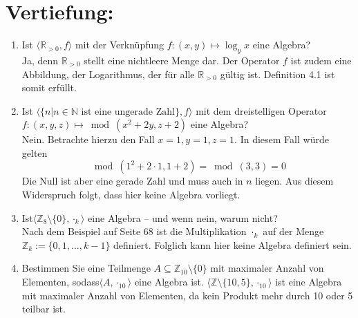 

\DeclareMathOperator{\kgV}{kgV}


    \maketitle
    \section*{Vertiefung:}
    \begin{enumerate}[label=(\alph*)]
        \item Ist $\langle \mathbb{R}_{>0} , f \rangle$ mit der Verknüpfung $f : (x,y) \mapsto  \log_y x$ eine Algebra? \\
        Ja, denn $\mathbb{R}_{>0}$ stellt eine nichtleere Menge dar. Der Operator $f$ ist zudem eine Abbildung, 
        der Logarithmus, der für alle $\mathbb{R}_{>0}$ gültig ist. Definition 4.1 ist somit erfüllt.
        
        \item Ist $\langle \{n| n \in \mathbb{N} \textrm{ ist eine ungerade Zahl} \}, f \rangle$ mit dem dreistelligen 
        Operator $f : (x,y,z) \mapsto \bmod(x^2 + 2y, z + 2)$ eine Algebra? \\
        Nein. Betrachte hierzu den Fall $x = 1, y = 1, z = 1$. In diesem Fall würde gelten 
        $$\bmod(1^2 + 2 \cdot 1, 1 + 2 ) = \bmod(3,3) = 0$$ Die Null ist aber eine gerade Zahl und muss auch 
        in $n$ liegen. Aus diesem Widerspruch folgt, dass hier keine Algebra vorliegt.
        
        \item
         Ist$\langle \mathbb{Z}_8 \setminus \{0\}, \cdot_k \rangle $ eine Algebra – und wenn nein, warum nicht? \\
         Nach dem Beispiel auf Seite 68 ist die Multiplikation $\cdot_k$ auf der Menge $\mathbb{Z}_k := \{0, 1, ..., k-1\}$ definiert. Folglich kann hier keine Algebra definiert sein.
        \item
        Bestimmen Sie eine Teilmenge $A \subseteq \mathbb{Z}_{10} \setminus \{0\} $ mit maximaler Anzahl von Elementen, sodass$\langle A, \cdot_{10} \rangle$ eine Algebra ist. 
        $\langle \mathbb{Z} \setminus \{10, 5\}, \cdot_{10} \rangle $ ist eine Algebra mit maximaler Anzahl von Elementen, da kein  Produkt mehr durch 10 oder 5 teilbar ist.
        

\end{enumerate}
